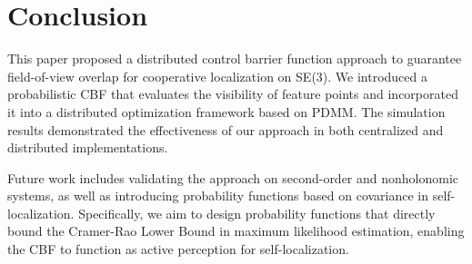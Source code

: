 \documentclass[fleqn,10pt,twocolumn]{SICE_FES25}
\theoremstyle{definition}
\theoremstyle{plain}
\begin{document}
\section{Conclusion}

This paper proposed a distributed control barrier function approach to guarantee field-of-view overlap for cooperative localization on SE(3). We introduced a probabilistic CBF that evaluates the visibility of feature points and incorporated it into a distributed optimization framework based on PDMM. The simulation results demonstrated the effectiveness of our approach in both centralized and distributed implementations.

Future work includes validating the approach on second-order and nonholonomic systems, as well as introducing probability functions based on covariance in self-localization. Specifically, we aim to design probability functions that directly bound the Cramer-Rao Lower Bound in maximum likelihood estimation, enabling the CBF to function as active perception for self-localization.
\end{document}

